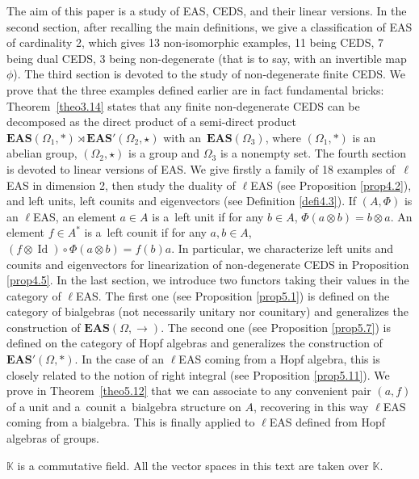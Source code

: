 \documentclass[pdftex]{sigma}
\numberwithin{equation}{section}
\newcommand{\eas}{\mathbf{EAS}}
\begin{document}
The aim of this paper is a study of EAS, CEDS, and their linear versions. In the second section, after recalling the main definitions, we give a classification of EAS of cardinality 2,
which gives 13 non-isomorphic examples, 11 being CEDS, 7 being dual CEDS, 3 being non-degenerate (that is to say, with an invertible map $\phi$).
The third section is devoted to the study of non-degenerate finite CEDS. We prove that the three examples defined earlier are in fact fundamental bricks:
Theorem~\ref{theo3.14} states that any finite non-degenerate CEDS can be decomposed as the direct product of a semi-direct product $\eas(\Omega_1,*) \rtimes \eas'(\Omega_2,\star)$ with an~$\eas(\Omega_3)$,
where $(\Omega_1,*)$ is an abelian group, $(\Omega_2,\star)$ is a group and $\Omega_3$ is a nonempty set. The fourth section is devoted to linear versions of EAS.
We give firstly a family of 18 examples of~$\ell$EAS in dimension 2, then study the duality of $\ell$EAS (see Proposition \ref{prop4.2}), and left units, left counits and eigenvectors (see Definition \ref{defi4.3}).
If $(A,\Phi)$ is an $\ell$EAS, an element $a\in A$ is a~left unit if for any $b\in A$, $\Phi(a\otimes b)=b\otimes a$. An element $f \in A^*$ is a~left counit if for any $a,b\in A$, $(f\otimes \operatorname{Id})\circ \Phi(a\otimes b)=f(b)a$.
In particular, we characterize left units and counits and eigenvectors for linearization of non-degenerate CEDS in Proposition \ref{prop4.5}.
In the last section, we introduce two functors taking their values in the category of $\ell$EAS.
The first one (see Proposition \ref{prop5.1}) is defined on the category of bialgebras (not necessarily unitary nor counitary) and generalizes the construction of $\eas(\Omega,\rightarrow)$.
The second one (see Proposition \ref{prop5.7}) is defined on the category of Hopf algebras and generalizes the construction of $\eas'(\Omega,*)$.
In the case of an $\ell$EAS coming from a Hopf algebra, this is closely related to the notion of right integral (see Proposition \ref{prop5.11}).
We prove in Theorem~\ref{theo5.12} that we can associate to any convenient pair $(a,f)$ of a unit and a~counit a~bialgebra structure on $A$, recovering in this way $\ell$EAS coming from a bialgebra.
This is finally applied to $\ell$EAS defined from Hopf algebras of groups.



\begin{Notation}
$\mathbb{K}$ is a commutative field. All the vector spaces in this text are taken over $\mathbb{K}$.
\end{Notation}
\end{document}
